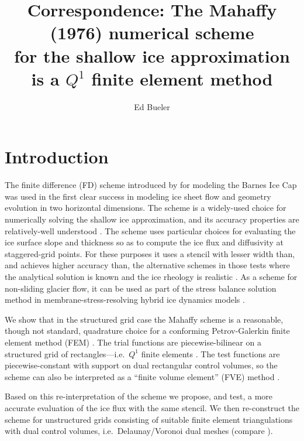 \documentclass[11pt]{amsart}
\title[Correspondence: The Mahaffy scheme is a $Q^1$ FEM]{Correspondence: The Mahaffy (1976) numerical scheme \\ for the shallow ice approximation \\ is a $Q^1$ finite element method}
\author{Ed Bueler}
\begin{document}

\maketitle

\thispagestyle{empty}


\section{Introduction}

The finite difference (FD) scheme introduced by \cite{Mahaffy1976} for modeling the Barnes Ice Cap was used in the first clear success in modeling ice sheet flow and geometry evolution in two horizontal dimensions.  The scheme is a widely-used choice for numerically solving the shallow ice approximation, and its accuracy properties are relatively-well understood \cite{Bueleretal2005}.  The scheme uses particular choices for evaluating the ice surface slope and thickness so as to compute the ice flux and diffusivity at staggered-grid points.  For these purposes it uses a stencil with lesser width than, and achieves higher accuracy than, the alternative schemes in those tests where the analytical solution is known and the ice rheology is realistic \cite{HindmarshPayne1996}.  As a scheme for non-sliding glacier flow, it can be used as part of the stress balance solution method in membrane-stress-resolving hybrid ice dynamics models \cite{BuelerBrown2009}.

We show that in the structured grid case the Mahaffy scheme is a reasonable, though not standard, quadrature choice for a conforming Petrov-Galerkin finite element method (FEM) \cite{Elmanetal2005}.  The trial functions are piecewise-bilinear on a structured grid of rectangles---i.e.~$Q^1$ finite elements \cite{Elmanetal2005}.  The test functions are piecewise-constant with support on dual rectangular control volumes, so the scheme can also be interpreted as a ``finite volume element'' (FVE) method \cite{EwingLinLin2002}.

Based on this re-interpretation of the scheme we propose, and test, a more accurate evaluation of the ice flux with the same stencil.  We then re-construct the scheme for unstructured grids consisting of suitable finite element triangulations with dual control volumes, i.e.~Delaunay/Voronoi dual meshes (compare \cite{Ringleretal2013}).
\end{document}

